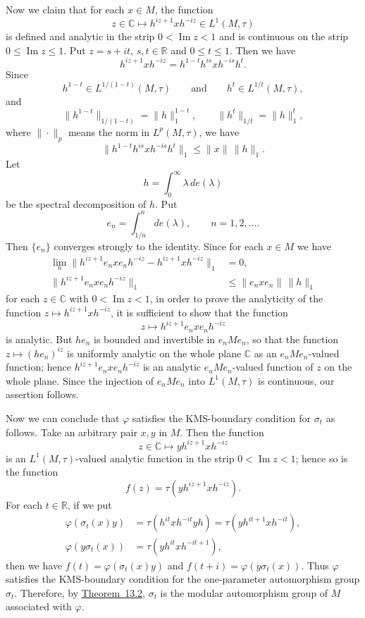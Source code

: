 \documentclass[12pt,b5paper,twoside]{article}
\theoremstyle{takesaki}
\numberwithin{equation}{section}
\begin{document}
Now we claim that for each $x\in M$, the function
\[
 z\in\mathbb C\longmapsto h^{iz+1}xh^{-iz}\in L^1(M,\tau)
\]
is defined and analytic in the strip $0<\operatorname{Im}z<1$ and is
continuous on the strip $0\leq\operatorname{Im}z\leq1$.  Put
$z=s+it$, $s,t\in\mathbb R$ and $0\leq t\leq1$.  Then we have
\[
 h^{iz+1}xh^{-iz}=h^{1-t}h^{is}xh^{-is}h^t.
\]
Since
\[
 h^{1-t}\in L^{1/(1-t)}(M,\tau)
 \qquad\text{and}\qquad
 h^t\in L^{1/t}(M,\tau),
\]
and
\[
 \|h^{1-t}\|_{1/(1-t)}=\|h\|_1^{1-t},
 \qquad
 \|h^t\|_{1/t}=\|h\|_1^t,
\]
where $\|\cdot\|_p$ means the norm in $L^p(M,\tau)$, we have
\[
 \|h^{1-t}h^{is}xh^{-is}h^t\|_1
 \leq\|x\|\,\|h\|_1.
\]
Let
\[
 h=\int_0^\infty\lambda\,de(\lambda)
\]
be the spectral decomposition of $h$.  Put
\[
 e_n=\int_{1/n}^{n}de(\lambda),
 \qquad n=1,2,\ldots.
\]
Then $\{e_n\}$ converges strongly to the identity.  Since for each
$x\in M$ we have
\begin{align*}
 \lim_n\|h^{iz+1}e_nxe_nh^{-iz}-h^{iz+1}xh^{-iz}\|_1&=0,\\
 \|h^{iz+1}e_nxe_nh^{-iz}\|_1
 &\leq\|e_nxe_n\|\,\|h\|_1
\end{align*}
for each $z\in\mathbb C$ with $0<\operatorname{Im}z<1$, in
order to prove the analyticity of the function
$z\mapsto h^{iz+1}xh^{-iz}$, it is sufficient to show that the
function
\[
 z\longmapsto h^{iz+1}e_nxe_nh^{-iz}
\]
is analytic.  But $he_n$ is bounded and invertible in $e_nMe_n$, so
that the function $z\mapsto(he_n)^{iz}$ is uniformly analytic on the
whole plane $\mathbb C$ as an $e_nMe_n$-valued function; hence
$h^{iz+1}e_nxe_nh^{-iz}$ is an analytic $e_nMe_n$-valued function of
$z$ on the whole plane.  Since the injection of $e_nMe_n$ into
$L^1(M,\tau)$ is continuous, our assertion follows.

Now we can conclude that $\varphi$ satisfies the KMS-boundary
condition for $\sigma_t$ as follows.  Take an arbitrary pair $x,y$ in
$M$.  Then the function
\[
 z\in\mathbb C\longmapsto yh^{iz+1}xh^{-iz}
\]
is an $L^1(M,\tau)$-valued analytic function in the strip
$0<\operatorname{Im}z<1$; hence so is the function
\[
 f(z)=\tau(yh^{iz+1}xh^{-iz}).
\]
For each $t\in\mathbb R$, if we put
\begin{align*}
 \varphi(\sigma_t(x)y)
 &=\tau(h^{it}xh^{-it}yh)
  =\tau(yh^{it+1}xh^{-it}),\\
 \varphi(y\sigma_t(x))
 &=\tau(yh^{it}xh^{-it+1}),
\end{align*}
then we have
$f(t)=\varphi(\sigma_t(x)y)$ and
$f(t+i)=\varphi(y\sigma_t(x))$.  Thus $\varphi$ satisfies the
KMS-boundary condition for the one-parameter automorphism group
$\sigma_t$.  Therefore, by \hyperref[thm:13.2]{Theorem~13.2},
$\sigma_t$ is the modular automorphism group of $M$ associated with
$\varphi$.
\end{document}
